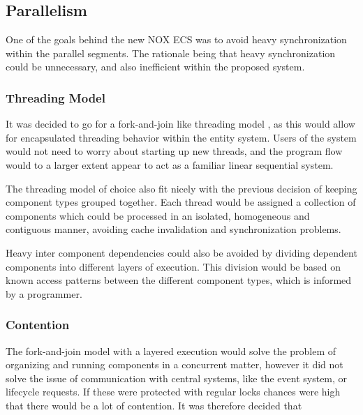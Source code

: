 \subsection{Parallelism}
One of the goals behind the new NOX ECS was to avoid heavy synchronization within the parallel segments.
The rationale being that heavy synchronization could be unnecessary, and also inefficient within the proposed system.

\subsubsection{Threading Model}
It was decided to go for a fork-and-join like threading model ,
as this would allow for encapsulated threading behavior within the entity system.
Users of the system would not need to worry about starting up new threads,
and the program flow would to a larger extent appear to act as a familiar linear sequential system.

The threading model of choice also fit nicely with the previous decision of keeping component types
grouped together.
Each thread would be assigned a collection of components which could be processed in an isolated,
homogeneous and contiguous manner, avoiding cache invalidation and synchronization problems.

Heavy inter component dependencies could also be avoided by dividing dependent components
into different layers of execution. 
This division would be based on known access patterns between the different component types,
which is informed by a programmer.

\subsubsection{Contention}
The fork-and-join model with a layered execution would solve the problem of organizing and running components
in a concurrent matter, however it did not solve the issue of communication with central systems, like the event system, or lifecycle requests.
If these were protected with regular locks chances were high that there would be a lot of contention.
It was therefore decided that

